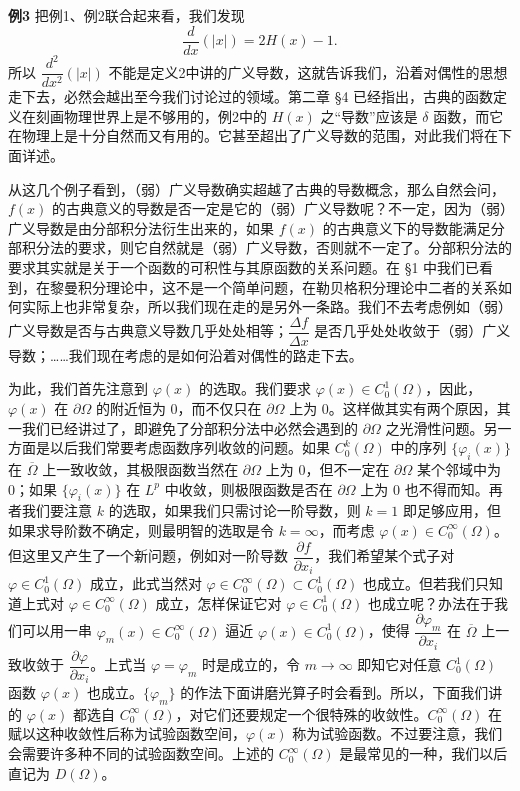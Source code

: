 \noindent\textbf{例3}
把例1、例2联合起来看，我们发现
\[
 \frac d{dx}(|x|)=2H(x)-1.
\]
所以 $\dfrac{d^2}{dx^2}(|x|)$ 不能是定义2中讲的广义导数，这就告诉我们，沿着对偶性的思想走下去，必然会越出至今我们讨论过的领域。第二章 §4 已经指出，古典的函数定义在刻画物理世界上是不够用的，例2中的 $H(x)$ 之“导数”应该是 $\delta$ 函数，而它在物理上是十分自然而又有用的。它甚至超出了广义导数的范围，对此我们将在下面详述。

从这几个例子看到，（弱）广义导数确实超越了古典的导数概念，那么自然会问，$f(x)$ 的古典意义的导数是否一定是它的（弱）广义导数呢？不一定，因为（弱）广义导数是由分部积分法衍生出来的，如果 $f(x)$ 的古典意义下的导数能满足分部积分法的要求，则它自然就是（弱）广义导数，否则就不一定了。分部积分法的要求其实就是关于一个函数的可积性与其原函数的关系问题。在 §1 中我们已看到，在黎曼积分理论中，这不是一个简单问题，在勒贝格积分理论中二者的关系如何实际上也非常复杂，所以我们现在走的是另外一条路。我们不去考虑例如（弱）广义导数是否与古典意义导数几乎处处相等；$\dfrac{\Delta f}{\Delta x}$ 是否几乎处处收敛于（弱）广义导数；……我们现在考虑的是如何沿着对偶性的路走下去。

为此，我们首先注意到 $\varphi(x)$ 的选取。我们要求 $\varphi(x)\in C_0^1(\Omega)$，因此，$\varphi(x)$ 在 $\partial\Omega$ 的附近恒为 0，而不仅只在 $\partial\Omega$ 上为 0。这样做其实有两个原因，其一我们已经讲过了，即避免了分部积分法中必然会遇到的 $\partial\Omega$ 之光滑性问题。另一方面是以后我们常要考虑函数序列收敛的问题。如果 $C_0^k(\Omega)$ 中的序列 $\{\varphi_i(x)\}$ 在 $\overline\Omega$ 上一致收敛，其极限函数当然在 $\partial\Omega$ 上为 0，但不一定在 $\partial\Omega$ 某个邻域中为 0；如果 $\{\varphi_i(x)\}$ 在 $L^p$ 中收敛，则极限函数是否在 $\partial\Omega$ 上为 0 也不得而知。再者我们要注意 $k$ 的选取，如果我们只需讨论一阶导数，则 $k=1$ 即足够应用，但如果求导阶数不确定，则最明智的选取是令 $k=\infty$，而考虑 $\varphi(x)\in C_0^\infty(\Omega)$。但这里又产生了一个新问题，例如对一阶导数 $\dfrac{\partial f}{\partial x_i}$，我们希望某个式子对 $\varphi\in C_0^1(\Omega)$ 成立，此式当然对 $\varphi\in C_0^\infty(\Omega)\subset C_0^1(\Omega)$ 也成立。但若我们只知道上式对 $\varphi\in C_0^\infty(\Omega)$ 成立，怎样保证它对 $\varphi\in C_0^1(\Omega)$ 也成立呢？办法在于我们可以用一串 $\varphi_m(x)\in C_0^\infty(\Omega)$ 逼近 $\varphi(x)\in C_0^1(\Omega)$，使得 $\dfrac{\partial\varphi_m}{\partial x_i}$ 在 $\overline\Omega$ 上一致收敛于 $\dfrac{\partial\varphi}{\partial x_i}$。上式当 $\varphi=\varphi_m$ 时是成立的，令 $m\to\infty$ 即知它对任意 $C_0^1(\Omega)$ 函数 $\varphi(x)$ 也成立。$\{\varphi_m\}$ 的作法下面讲磨光算子时会看到。所以，下面我们讲的 $\varphi(x)$ 都选自 $C_0^\infty(\Omega)$，对它们还要规定一个很特殊的收敛性。$C_0^\infty(\Omega)$ 在赋以这种收敛性后称为试验函数空间，$\varphi(x)$ 称为试验函数。不过要注意，我们会需要许多种不同的试验函数空间。上述的 $C_0^\infty(\Omega)$ 是最常见的一种，我们以后直记为 $D(\Omega)$。

